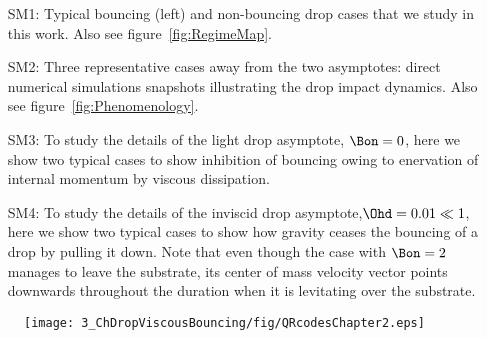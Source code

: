 \begin{subappendices}
	\begin{enumerate}
		\item[SM1:] Typical bouncing (left) and non-bouncing drop cases that we study in this work. Also see figure~\ref{fig:RegimeMap}.
		\item[SM2:] Three representative cases away from the two asymptotes: direct numerical simulations snapshots illustrating the drop impact dynamics.  Also see figure~\ref{fig:Phenomenology}.
		\item[SM3:] To study the details of the light drop asymptote, $\Bon = 0$, here we show two typical cases to show inhibition of bouncing owing to enervation of internal momentum by viscous dissipation. 
		\item[SM4:] To study the details of the inviscid drop asymptote,$\Ohd = 0.01 \ll 1$, here we show two typical cases to show how gravity ceases the bouncing of a drop by pulling it down. Note that even though the case with $\Bon = 2$ manages to leave the substrate, its center of mass velocity vector points downwards throughout the duration when it is levitating over the substrate. 
	\end{enumerate}

	\begin{figure*}
		\centering
		\texttt{[image: 3\_ChDropViscousBouncing/fig/QRcodesChapter2.eps]}
	\end{figure*}
	
\end{subappendices}
